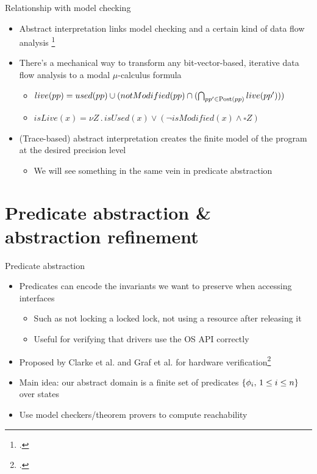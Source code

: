 \documentclass[aspectratio=169]{beamer}
\begin{document}
\begin{frame}{Relationship with model checking}
  \begin{itemize}[<+->]
  \item Abstract interpretation links model
    checking and a certain kind of data flow analysis
    \footcite{schmidt1998program,schmidt1998data}
  \item There's a mechanical way to transform any bit-vector-based,
    iterative data flow analysis to a modal $\mu$-calculus formula
    \begin{itemize}
    \item
      $live(pp) = used(pp) \cup (notModified(pp) \cap (\bigcap_{pp' \in
        \mathrm{Post}(pp)} live(pp')))$
      \vspace{.5em}
    \item
      $isLive(x) = \nu Z \,.\, isUsed(x) \vee (\neg isModified(x)
      \wedge \square Z)$
    \end{itemize}
  \item (Trace-based) abstract interpretation creates the finite model of the
    program at the desired precision level
    \begin{itemize}
    \item We will see something in the same vein in predicate abstraction
    \end{itemize}
  \end{itemize}
\end{frame}

\section{Predicate abstraction \& abstraction refinement}

\begin{frame}{Predicate abstraction}
  \begin{itemize}[<+->]
  \item Predicates can encode the invariants we want to preserve when accessing interfaces
    \begin{itemize}
    \item Such as not locking a locked lock, not using a resource after releasing it
    \item Useful for verifying that drivers use the OS API correctly
    \end{itemize}
  \item Proposed by Clarke et al. and Graf et al. for hardware verification\footcite{clarke1994model,graf1997construction}
  \item Main idea: our abstract domain is a finite set of predicates $\left\{\phi_i,\, 1 \le i\le n\right\}$ over states
  \item Use model checkers/theorem provers to compute reachability
  \end{itemize}
\end{frame}
\end{document}
